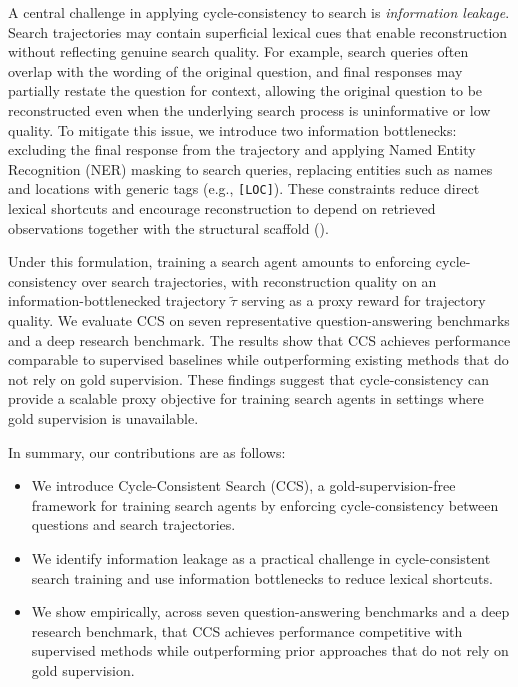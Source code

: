 A central challenge in applying cycle-consistency to search is \emph{information leakage}. Search trajectories may contain superficial lexical cues that enable reconstruction without reflecting genuine search quality. For example, search queries often overlap with the wording of the original question, and final responses may partially restate the question for context, allowing the original question to be reconstructed even when the underlying search process is uninformative or low quality. To mitigate this issue, we introduce two information bottlenecks: excluding the final response from the trajectory and applying Named Entity Recognition (NER) masking \citep{yamada2020luke, sun2019ernie, liu2020k} to search queries, replacing entities such as names and locations with generic tags (e.g., \texttt{[LOC]}). These constraints reduce direct lexical shortcuts and encourage reconstruction to depend on retrieved observations together with the structural scaffold ().



Under this formulation, training a search agent amounts to enforcing cycle-consistency over search trajectories, with reconstruction quality on an information-bottlenecked trajectory $\tilde{\tau}$ serving as a proxy reward for trajectory quality. We evaluate CCS on seven representative question-answering benchmarks and a deep research benchmark. The results show that CCS achieves performance comparable to supervised baselines while outperforming existing methods that do not rely on gold supervision. These findings suggest that cycle-consistency can provide a scalable proxy objective for training search agents in settings where gold supervision is unavailable.

In summary, our contributions are as follows:
\begin{itemize}
    \item We introduce Cycle-Consistent Search (CCS), a gold-supervision-free framework for training search agents by enforcing cycle-consistency between questions and search trajectories.
    \item We identify information leakage as a practical challenge in cycle-consistent search training and use information bottlenecks to reduce lexical shortcuts.
    \item We show empirically, across seven question-answering benchmarks and a deep research benchmark, that CCS achieves performance competitive with supervised methods while outperforming prior approaches that do not rely on gold supervision.
\end{itemize}